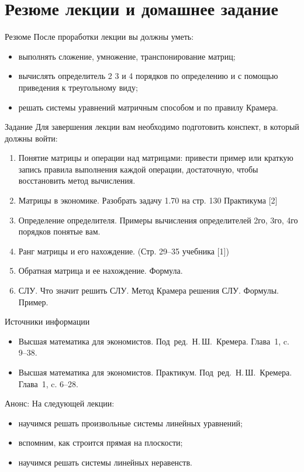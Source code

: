 \documentclass[unicode,11pt,notheorems]{beamer}
\begin{document}
\section{Резюме лекции и домашнее задание}
\begin{frame}{Резюме}
	После проработки лекции вы должны уметь:
	\begin{itemize}
	\item 
		выполнять сложение, умножение, транспонирование матриц;
	\item 
		вычислять определитель 2 3 и 4 порядков по определению и с помощью приведения к треугольному виду;
	\item 
		решать системы уравнений матричным способом и по правилу Крамера.
	\end{itemize}		
\end{frame}


\begin{frame}{Задание}
Для завершения лекции вам необходимо подготовить конспект, в который должны войти:
	\begin{enumerate}
		\item 
			Понятие матрицы и операции над матрицами: привести пример или краткую запись правила выполнения каждой операции, достаточную, чтобы восстановить метод вычисления.
		\item 
			Матрицы в экономике. Разобрать задачу 1.70 на стр. 130 Практикума [2]
		\item 
			Определение определителя. 
			Примеры вычисления определителей 2го, 3го, 4го порядков понятые вам. 
		\item 
			Ранг матрицы и его нахождение. (Стр. 29--35 учебника [1])
		\item 
			Обратная матрица и ее нахождение. Формула.
		\item 
			СЛУ. Что значит решить СЛУ. Метод Крамера решения СЛУ. Формулы. Пример.
	\end{enumerate}
\end{frame}
\begin{frame}{Источники информации}
\begin{itemize}
\item 
	Высшая математика для экономистов. Под~ред.~Н.\,Ш.~Кремера. Глава~1, c. 9--38.
\item 
	Высшая математика для экономистов. Практикум. Под~ред.~Н.\,Ш.~Кремера. Глава~1, c. 6--28.
\end{itemize}

\end{frame}

\begin{frame}{Анонс:}
	На следующей лекции:
	\begin{itemize}
	\item 
		научимся решать произвольные системы линейных уравнений;
	\item 
		вспомним, как строится прямая на плоскости;
	\item 
		научимся решать системы линейных неравенств.
	\end{itemize}

\end{frame}
\end{document}

